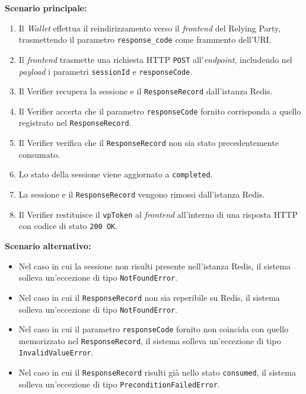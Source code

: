 \noindent\textbf{Scenario principale:}
\begin{enumerate}
    \item Il \textit{Wallet} effettua il reindirizzamento verso il \textit{frontend} del Relying Party, trasmettendo il parametro \texttt{response\_\allowbreak{}code} come frammento dell'URI.
    \item Il \textit{frontend} trasmette una richiesta HTTP \texttt{POST} all'\textit{endpoint}, includendo nel \textit{payload} i parametri \texttt{sessionId} e \texttt{responseCode}.
    \item Il Verifier recupera la sessione e il \texttt{ResponseRecord} dall'istanza Redis.
    \item Il Verifier accerta che il parametro \texttt{responseCode} fornito corrisponda a quello registrato nel \texttt{ResponseRecord}.
    \item Il Verifier verifica che il \texttt{ResponseRecord} non sia stato precedentemente consumato.
    \item Lo stato della sessione viene aggiornato a \texttt{completed}.
    \item La sessione e il \texttt{ResponseRecord} vengono rimossi dall'istanza Redis.
    \item Il Verifier restituisce il \texttt{vpToken} al \textit{frontend} all'interno di una risposta HTTP con codice di stato \texttt{200 OK}.
\end{enumerate}

\noindent\textbf{Scenario alternativo:}
\begin{itemize}
    \item Nel caso in cui la sessione non risulti presente nell'istanza Redis, il sistema solleva un'eccezione di tipo \texttt{NotFoundError}.
    \item Nel caso in cui il \texttt{ResponseRecord} non sia reperibile su Redis, il sistema solleva un'eccezione di tipo \texttt{NotFoundError}.
    \item Nel caso in cui il parametro \texttt{responseCode} fornito non coincida con quello memorizzato nel \texttt{ResponseRecord}, il sistema solleva un'eccezione di tipo \texttt{InvalidValueError}.
    \item Nel caso in cui il \texttt{ResponseRecord} risulti già nello stato \texttt{consumed}, il sistema solleva un'eccezione di tipo \texttt{PreconditionFailedError}.
\end{itemize}


